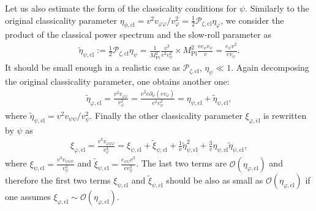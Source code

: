 \documentclass[aps, prd
, preprint
, nofootinbib 
, superscriptaddress
, longbibliography
]{revtex4-1}
\newcommand{\Mpl}{M_\text{Pl}}
\newcommand{\cl}{\text{cl}}
\newcommand{\calO}{\mathcal{O}}
\newcommand{\calP}{\mathcal{P}}
\newcommand{\bae}[1]{\begin{align} #1 \end{align}}
\begin{document}
Let us also estimate the form of the classicality conditions for $\psi$. Similarly to the original classicality parameter 
$\eta_{\phi,\cl}=v^2v_{\varphi\varphi}/v_\varphi^2=\frac{1}{2}\calP_{\zeta,\cl}\eta_\varphi$, 
we consider the product of the classical power spectrum
and the slow-roll parameter as
\bae{
	\tilde{\eta}_{\psi,\cl}:=\frac{1}{2}\calP_{\zeta,\cl}\eta_\psi=\frac{1}{\Mpl^2}\frac{v^3}{e^2v_\psi^2}\times\Mpl^2\frac{ee_\psi v_\psi}{v}
	=\frac{e_\psi v^2}{ev_\psi}.
}
It should be small enough in a realistic case as $\calP_{\zeta,\cl}$, $\eta_\psi\ll1$. Again decomposing the original classicality parameter, one obtains another one:
\bae{\label{eq: decomposition of eta_phicl}
	\tilde{\eta}_{\varphi,\cl}=\frac{v^2v_{\varphi\varphi}}{v_\varphi^2}
	=\frac{v^2e\partial_\psi(ev_\psi)}{e^2v_\psi^2}=\eta_{\psi,\cl}+\tilde{\eta}_{\psi,\cl},
}
where $\tilde{\eta}_{\psi,\cl}=v^2v_{\psi\psi}/v_\psi^2$.
Finally the other classicality parameter $\xi_{\varphi,\cl}$ is rewritten by $\psi$ as
\bae{
	\xi_{\varphi,\cl}=\frac{v^3v_{\varphi\varphi\varphi}}{v_\varphi^3}=\xi_{\psi,\cl}+\tilde{\xi}_{\psi,\cl}
	+\frac{1}{v}\tilde{\eta}_{\psi,\cl}^2+\frac{3}{v}\eta_{\psi,\cl}\tilde{\eta}_{\psi,\cl},
}
where $\xi_{\psi,\cl}=\frac{v^3v_{\psi\psi\psi}}{v_\psi^3}$ and
$\tilde{\xi}_{\psi,\cl}=\frac{e_{\psi\psi}v^3}{ev_\psi^2}$.
The last two terms are $\calO(\eta_{\varphi,\cl})$ and therefore the first two terms $\xi_{\psi,\cl}$ and
$\tilde{\xi}_{\psi,\cl}$ should be also as small as $\calO(\eta_{\varphi,\cl})$ if one assumes 
$\xi_{\varphi,\cl}\sim\calO(\eta_{\varphi,\cl})$. 
\end{document}
